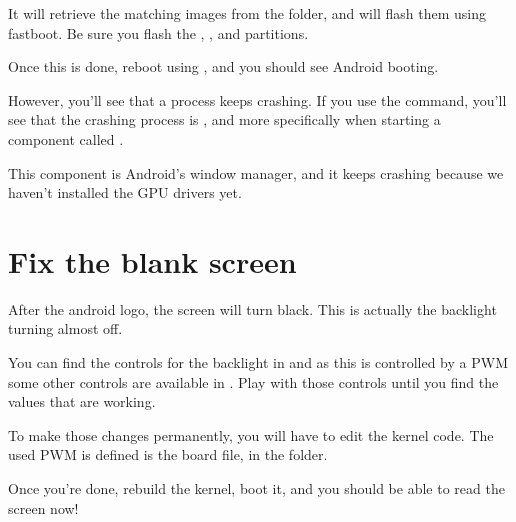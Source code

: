It will retrieve the matching images from the  folder, and
will flash them using fastboot. Be sure you flash the ,
,  and  partitions.

Once this is done, reboot using , and you should
see Android booting.

However, you'll see that a process keeps crashing. If you use the
 command, you'll see that the crashing process is
, and more specifically when starting a component called
.

This component is Android's window manager, and it keeps crashing
because we haven't installed the GPU drivers yet.

\section{Fix the blank screen}

After the android logo, the screen will turn black. This is actually
the backlight turning almost off.

You can find the controls for the backlight in
 and as this is controlled by a PWM some
other controls are available in . Play with those
controls until you find the values that are working.

To make those changes permanently, you will have to edit the kernel
code. The used PWM is defined is the  board file, in
the  folder.

Once you're done, rebuild the kernel, boot it, and you should be able
to read the screen now!

